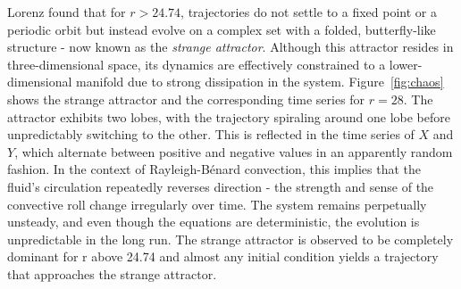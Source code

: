 \documentclass[paper=a4, fontsize=11pt]{scrartcl}
\numberwithin{equation}{section}		%
\numberwithin{figure}{section}			%
\numberwithin{table}{section}				%
\begin{document}
Lorenz found that for \( r > 24.74 \), trajectories do not settle to a fixed point or a periodic orbit but instead evolve on a complex set with a folded, butterfly-like structure - now known as the \textit{strange attractor}. Although this attractor resides in three-dimensional space, its dynamics are effectively constrained to a lower-dimensional manifold due to strong dissipation in the system. Figure~\ref{fig:chaos} shows the strange attractor and the corresponding time series for \( r = 28 \). The attractor exhibits two lobes, with the trajectory spiraling around one lobe before unpredictably switching to the other. This is reflected in the time series of \( X \) and \( Y \), which alternate between positive and negative values in an apparently random fashion. In the context of Rayleigh-Bénard convection, this implies that the fluid’s circulation repeatedly reverses direction - the strength and sense of the convective roll change irregularly over time. The system remains perpetually unsteady, and even though the equations are deterministic, the evolution is unpredictable in the long run. The strange attractor is observed to be completely dominant for r above 24.74 and almost any initial condition yields a trajectory that approaches the strange attractor. \\
\end{document}
